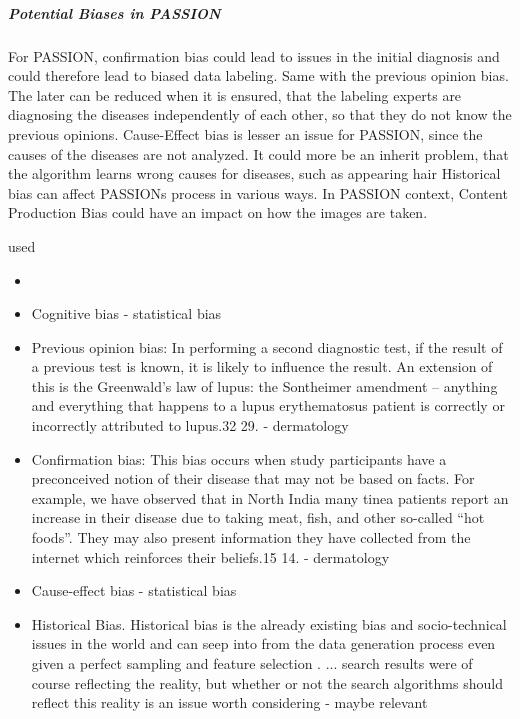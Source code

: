 \begin{refsection}
		\subparagraph{Potential Biases in PASSION}
		For PASSION, confirmation bias could lead to issues in the initial diagnosis and could therefore lead to biased data labeling. Same with the previous opinion bias. The later can be reduced when it is ensured, that the labeling experts are diagnosing the diseases independently of each other, so that they do not know the previous opinions.
		Cause-Effect bias is lesser an issue for PASSION, since the causes of the diseases are not analyzed. It could more be an inherit problem, that the algorithm learns wrong causes for diseases, such as appearing hair
		Historical bias can affect PASSIONs process in various ways.
		In PASSION context, Content Production Bias could have an impact on how the images are taken.
		
		
		\rawcitationstart
		used
		\begin{itemize}		
			\rawcitationusedstart
			\item  	
			\item Cognitive bias \autocites{Mester_2017} - statistical bias
			
			\item  Previous opinion bias: In performing a second diagnostic test, if the result of a previous test is known, it is likely to influence the result. An extension of this is the Greenwald’s law of lupus: the Sontheimer amendment – anything and everything that happens to a lupus erythematosus patient is correctly or incorrectly attributed to lupus.32 29. \autocite{Chakraborty_2024} - dermatology
			
			\item  Confirmation bias: This bias occurs when study participants have a preconceived notion of their disease that may not be based on facts. For example, we have observed that in North India many tinea patients report an increase in their disease due to taking meat, fish, and other so-called “hot foods”. They may also present information they have collected from the internet which reinforces their beliefs.15 14.\autocite{Chakraborty_2024} - dermatology
			
			\item Cause-effect bias \autocites{Mester_2022}{Mester_2017} - statistical bias
			
			
			\item Historical Bias. Historical bias is the already existing bias and socio-technical issues in the world and can seep into from the data generation process even given a perfect sampling and feature selection \autocite{M144_Suresh_2021}. ... search results were of course reflecting the reality, but whether or not the search algorithms should reflect this reality is an issue worth considering \autocite{Mehrabi_2021} - maybe relevant
			

\end{itemize}
\end{refsection}
